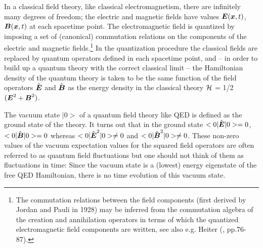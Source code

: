\documentclass[12pt]{article}
\newcommand{\BFACE}[1] {\mbox{\boldmath $#1$} }
\begin{document}
In a classical field theory, like classical electromagnetism,
there are infinitely many degrees of freedom; the electric and
magnetic fields have values ${\BFACE{E}} ({\BFACE{x}}, t)$,
${\BFACE{B}} ({\BFACE{x}}, t)$ at each spacetime point. The
electromagnetic field is quantized by imposing a set of
(canonical) commutation relations on the components of the
electric and magnetic fields.\footnote{The commutation relations
between the field components (first derived by Jordan and Pauli in
1928) may be inferred from the commutation algebra of the creation
and annihilation operators in terms of which the quantized
electromagnetic field components are written, see also e.g. Heiter
(\cite{heitler54}, pp.76-87).} In the quantization procedure
the classical fields are replaced by quantum operators defined in
each spacetime point, and -- in order to build up a quantum
theory with the correct classical limit -- the Hamiltonian density
of the quantum theory is taken to be the same function of the
field operators $\hat{{\BFACE{E}}}$ and $\hat{{\BFACE{B}}}$ as the
energy density in the classical theory ${\cal H}$ = 1/2
$({{\BFACE{E}}}^2 + {{\BFACE{B}}}^2 ) $. 

The vacuum state $|0>$ of a quantum field theory like QED
is defined as the ground state of the 
theory. It turns out that in the ground state 
$< 0| \hat{{\BFACE{E}}} |0> = 0$,   
$< 0|\hat{{\BFACE{B}}} |0> = 0 $ whereas
$< 0|\hat{{\BFACE{E}}}^2 |0> \neq 0$ and   
$< 0|\hat{{\BFACE{B}}}^2 |0> \neq 0$.
These non-zero values of the vacuum expectation values for the squared
field operators are often referred to as quantum field
fluctuations but one should not think of them as fluctuations in time: 
Since the vacuum state is a (lowest) energy eigenstate of the free QED 
Hamiltonian, there is no time evolution of this vacuum state.  
\end{document}
